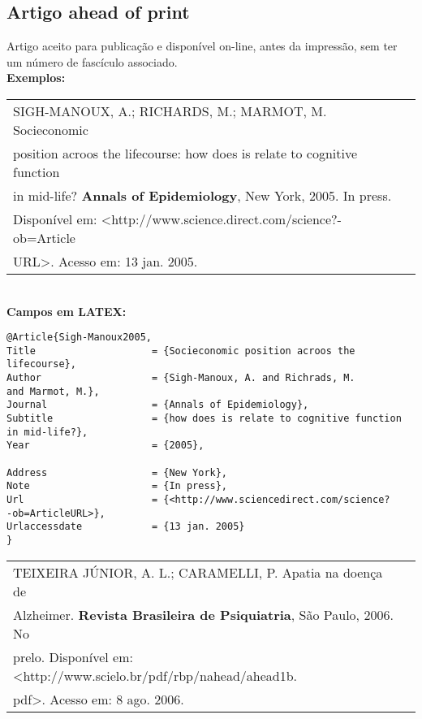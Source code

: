 \subsection{Artigo ahead of print}
	
Artigo aceito para publicação e disponível on-line, antes da impressão,
sem ter um número de fascículo associado. \\
	
\textbf{Exemplos:} \\
	
\begin{tabular}{|l|c|} \hline
	SIGH-MANOUX, A.; RICHARDS, M.; MARMOT, M. Socieconomic               
	                                                                     \\position acroos the lifecourse: how does is relate to cognitive function \\in
	mid-life? \textbf{Annals of Epidemiology}, New York, 2005. In press. \\Disponível
	em: <http://www.science.direct.com/science?-ob=Article               \\URL>. Acesso em: 13 jan. 2005. 
	                                                                     \\\hline
\end{tabular} \\
	
\textbf{Campos em LATEX:} 
	
\begingroup
\fontsize{10pt}{12pt}\selectfont
\begin{verbatim}
@Article{Sigh-Manoux2005,
Title                    = {Socieconomic position acroos the 
lifecourse},
Author                   = {Sigh-Manoux, A. and Richrads, M. 
and Marmot, M.},
Journal                  = {Annals of Epidemiology},
Subtitle                 = {how does is relate to cognitive function 
in mid-life?},
Year                     = {2005},

Address                  = {New York},
Note                     = {In press},
Url                      = {<http://www.sciencedirect.com/science?
-ob=ArticleURL>},
Urlaccessdate            = {13 jan. 2005}
}
\end{verbatim}
\endgroup
	
\begin{tabular}{|l|c|} \hline
	TEIXEIRA JÚNIOR, A. L.; CARAMELLI, P. Apatia na doença de \\Alzheimer. \textbf{Revista Brasileira de Psiquiatria}, São Paulo, 2006. No\\ prelo. Disponível em:
	<http://www.scielo.br/pdf/rbp/nahead/ahead1b.               \\pdf>. Acesso em: 8 ago.
	2006.                                                       
	                                                            \\\hline
\end{tabular} \\
	
